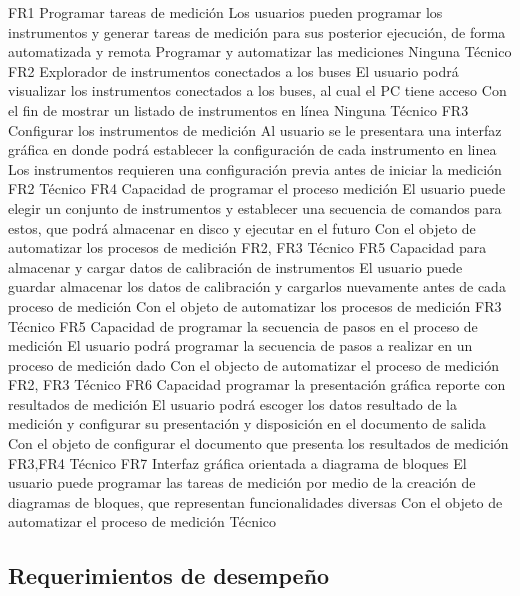 \documentclass[paper=letter,oneside,fontsize=12pt, parskip=full]{scrartcl}
\begin{document}
		{FR1}
			{Programar tareas de medición}
			{Los usuarios pueden programar los instrumentos y generar tareas de medición para sus posterior ejecución, de forma automatizada y remota}
			{Programar y automatizar las mediciones}
			{Ninguna}
			{Técnico}
		{FR2}
			{Explorador de instrumentos conectados a los buses}
			{El usuario podrá visualizar los instrumentos conectados a los buses, al cual el PC tiene acceso}
			{Con el fin de mostrar un listado de instrumentos en línea}
			{Ninguna}
			{Técnico}
		{FR3}
			{Configurar los instrumentos de medición}
			{Al usuario se le presentara una interfaz gráfica en donde podrá establecer la configuración de cada instrumento en linea}
			{Los instrumentos requieren una configuración previa antes de iniciar la medición}
			{FR2}
			{Técnico}
		{FR4}
			{Capacidad de programar el proceso medición}
			{El usuario puede elegir un conjunto de instrumentos y establecer una secuencia de comandos para estos, que podrá almacenar en disco y ejecutar en el futuro}
			{Con el objeto de automatizar los procesos de medición}
			{FR2, FR3}
			{Técnico}			
		{FR5}
			{Capacidad para almacenar y cargar datos de calibración de instrumentos}
			{El usuario puede guardar almacenar los datos de calibración y cargarlos nuevamente antes de cada proceso de medición}
			{Con el objeto de automatizar los procesos de medición}
			{FR3}
			{Técnico}
		{FR5}
			{Capacidad de programar la secuencia de pasos en el proceso de medición}
			{El usuario podrá programar la secuencia de pasos a realizar en un proceso de medición dado}
			{Con el objecto de automatizar el proceso de medición}
			{FR2, FR3}	
			{Técnico}		
		{FR6}
			{Capacidad programar la presentación gráfica reporte con resultados de medición}
			{El usuario podrá escoger los datos resultado de la medición y configurar su presentación y disposición en el documento de salida}
			{Con el objeto de configurar el documento que presenta los resultados de medición}
			{FR3,FR4}
			{Técnico}
		{FR7}
			{Interfaz gráfica orientada a diagrama de bloques}
			{El usuario puede programar las tareas de medición por medio de la creación de diagramas de bloques, que representan funcionalidades diversas}
			{Con el objeto de automatizar el proceso de medición}	
			{}		
			{Técnico}			
			
	\subsection{Requerimientos de desempeño}	
			
\end{document}
